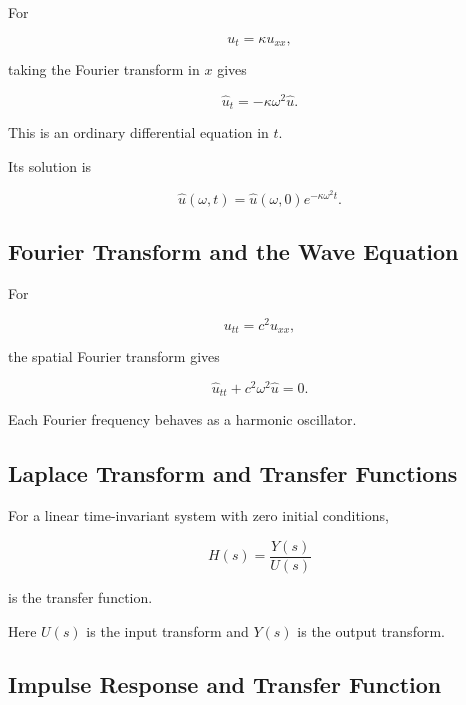 For

\[
u_t
=
\kappa u_{xx},
\]

taking the Fourier transform in \(x\) gives

\[
\boxed{
\widehat{u}_t
=
-\kappa\omega^2
\widehat{u}.
}
\]

This is an ordinary differential equation in \(t\).

Its solution is

\[
\boxed{
\widehat u(\omega,t)
=
\widehat u(\omega,0)
e^{-\kappa\omega^2t}.
}
\]

\subsection{Fourier Transform and the Wave Equation}
\label{subsec:fourier-wave-equation-reference}

For

\[
u_{tt}
=
c^2u_{xx},
\]

the spatial Fourier transform gives

\[
\boxed{
\widehat u_{tt}
+
c^2\omega^2
\widehat u
=
0.
}
\]

Each Fourier frequency behaves as a harmonic oscillator.

\subsection{Laplace Transform and Transfer Functions}
\label{subsec:laplace-transfer-function-reference}

For a linear time-invariant system with zero initial conditions,

\[
\boxed{
H(s)
=
\frac{
Y(s)
}{
U(s)
}
}
\]

is the transfer function.

Here \(U(s)\) is the input transform and \(Y(s)\) is the output transform.

\subsection{Impulse Response and Transfer Function}
\label{subsec:impulse-response-transfer-function}

